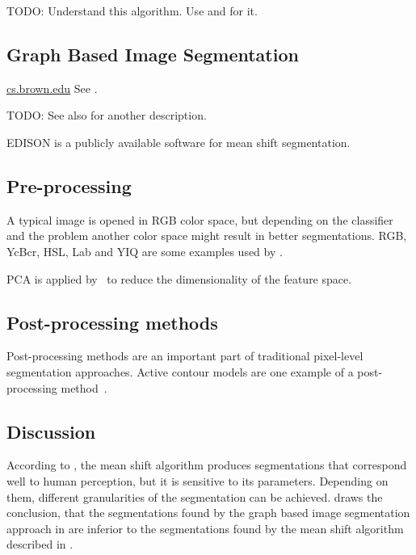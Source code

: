 TODO: Understand this algorithm. Use \cite{comaniciu2002mean} and
\cite{pantofaru2005comparison} for it.


\subsection{Graph Based Image Segmentation}\label{subsec:graph-based-image-segmentation}
\href{http://cs.brown.edu/~pff/segment/}{cs.brown.edu}
See \cite{felzenszwalb2004efficient}.

TODO: See also \cite{pantofaru2005comparison} for another description.

EDISON is a publicly available software for mean shift segmentation.\cite{christoudias2002synergism}


\subsection{Pre-processing}\label{subsec:preprocessing}
A typical image is opened in RGB color space, but depending on the classifier
and the problem another color space might result in better segmentations. RGB,
YcBcr, HSL, Lab and YIQ are some examples used by \cite{cohen2015memory}.

\Gls{PCA} is applied by~\cite{chen2011pixel} to reduce the dimensionality of
the feature space.

\subsection{Post-processing methods}\label{subsec:post-processing-methods}
Post-processing methods are an important part of traditional pixel-level
segmentation approaches. Active contour models are one example of a
post-processing method~\cite{kass1988snakes}.


\subsection{Discussion}\label{subsec:traditional-approaches-discussion}
According to \cite{pantofaru2005comparison}, the mean shift algorithm produces
segmentations that correspond well to human perception, but it is sensitive to
its parameters. Depending on them, different granularities of the segmentation
can be achieved. \cite{pantofaru2005comparison} draws the conclusion, that
the segmentations found by the graph based image segmentation approach
in \cite{felzenszwalb2004efficient} are inferior to the segmentations found
by the mean shift algorithm described in \cite{comaniciu2002mean}.
